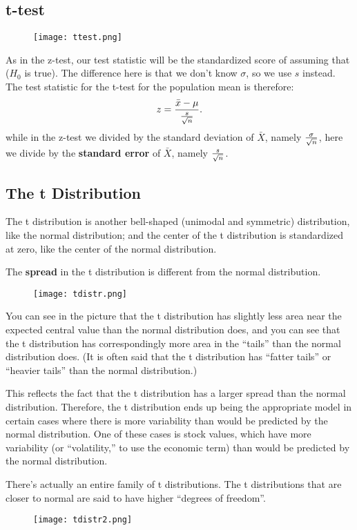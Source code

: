 \documentclass[10pt, a4paper]{article}
\begin{document}
\subsection{t-test}
\begin{figure}
[h!]
\centering
\texttt{[image: ttest.png]}
\end{figure}
As in the z-test, our test statistic will be the standardized score of assuming that ($H_0$ is true). The difference here is that we don't know $\sigma$, so we use $s$ instead. The test statistic for the t-test for the population mean is therefore:
\[
    z = {{\bar{x}-\mu}\over {s \over \sqrt{n}}}.
\]
while in the z-test we divided by the standard deviation of $\bar{X}$, namely $\sigma \over \sqrt{n}$, here we divide by the \textbf{standard error} of $\bar{X}$, namely $s \over \sqrt{n}$.\\
\subsection{The t Distribution}
The t distribution is another bell-shaped (unimodal and symmetric) distribution, like the normal distribution; and the center of the t distribution is standardized at zero, like the center of the normal distribution.\par
The \textbf{spread} in the t distribution is different from the normal distribution.
\begin{figure}
    [h!]
    \centering
    \texttt{[image: tdistr.png]}
\end{figure}
You can see in the picture that the t distribution has slightly less area near the expected central value than the normal distribution does, and you can see that the t distribution has correspondingly more area in the ``tails'' than the normal distribution does. (It is often said that the t distribution has ``fatter tails'' or ``heavier tails'' than the normal distribution.)\par
This reflects the fact that the t distribution has a larger spread than the normal distribution. 
Therefore, the t distribution ends up being the appropriate model in certain cases where there is more variability than would be predicted by the normal distribution. One of these cases is stock values, which have more variability (or ``volatility,'' to use the economic term) than would be predicted by the normal distribution.\par
There's actually an entire family of t distributions.  The t distributions that are closer to normal are said to have higher ``degrees of freedom''.
\begin{figure}
    [h!]
    \centering
    \texttt{[image: tdistr2.png]}
\end{figure}
\end{document}
